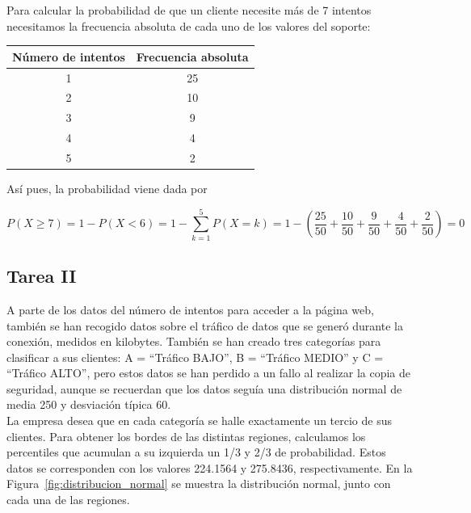 \documentclass[12pt,a4paper,twoside,openright,titlepage,final]{article}
\begin{document}
Para calcular la probabilidad de que un cliente necesite más de 7 intentos necesitamos la frecuencia absoluta de cada uno de los valores del soporte:

\begin{table}[htbp]
\centering
\begin{tabular}{|c|c|}
\hline Número de intentos & Frecuencia absoluta \\ 
\hline 1 & 25 \\ 
\hline 2 & 10 \\ 
\hline 3 & 9 \\ 
\hline 4 & 4 \\ 
\hline 5 & 2 \\ 
\hline 
\end{tabular} 
\end{table}

Así pues, la probabilidad viene dada por

\[ P(X \geq 7) = 1 - P(X < 6) = 1 - \sum_{k=1}^{5} P(X = k) = 1 - \left(  \dfrac{25}{50} + \dfrac{10}{50} + \dfrac{9}{50} + \dfrac{4}{50} + \dfrac{2}{50} \right) = 0  \]

\subsection{Tarea II}

A parte de los datos del número de intentos para acceder a la página web, también se han recogido datos sobre el tráfico de datos que se generó durante la conexión, medidos en kilobytes. También se han creado tres categorías para clasificar a sus clientes: A = ``Tráfico BAJO'', B = ``Tráfico MEDIO'' y C = ``Tráfico ALTO'', pero estos datos se han perdido a un fallo al realizar la copia de seguridad, aunque se recuerdan que los datos seguía una distribución normal de media 250 y desviación típica 60.\\

La empresa desea que en cada categoría se halle exactamente un tercio de sus clientes. Para obtener los bordes de las distintas regiones, calculamos los percentiles que acumulan a su izquierda un 1/3 y 2/3 de probabilidad. Estos datos se corresponden con los valores 224.1564 y 275.8436, respectivamente. En la Figura~\ref{fig:distribucion_normal} se muestra la distribución normal, junto con cada una de las regiones.\\
\end{document}
